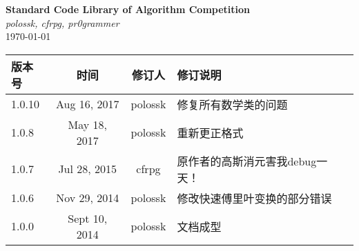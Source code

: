 \documentclass[12pt,a4paper,openany,oneside]{book}
\title{\strtitle}
\author{\strauthor}
\date{\today}
\newcommand\strtitle{Standard Code Library of Algorithm Competition}
\newcommand\strauthor{polossk, cfrpg, pr0grammer}
\begin{document}
\begin{titlepage}
\vspace*{\fill}
\begin{center}
    {\Huge \bf \strtitle} \\
    \vspace{1em}
    {\Large \it \strauthor} \\
    \vspace{1em}
    {\large \today} \\
\end{center}
\vspace{1em}
\begin{longtable}{|l|c|c|l|}
    \hline
    版本号 & 时间 & 修订人 & 修订说明 \\
    \hline
    1.0.10 & Aug 16, 2017 & polossk & 修复所有数学类的问题 \\
    \hline
    1.0.8 & May 18, 2017 & polossk & 重新更正格式 \\
    \hline
    1.0.7 & Jul 28, 2015 & cfrpg & 原作者的高斯消元害我debug一天！ \\
    \hline
    1.0.6 & Nov 29, 2014 & polossk & 修改快速傅里叶变换的部分错误 \\
    \hline
    1.0.0 & Sept 10, 2014 & polossk & 文档成型 \\
    \hline
\end{longtable}
\end{titlepage}
\thispagestyle{fancy}
\clearpage
{}
{}
\tableofcontents
\clearpage









\end{document}
